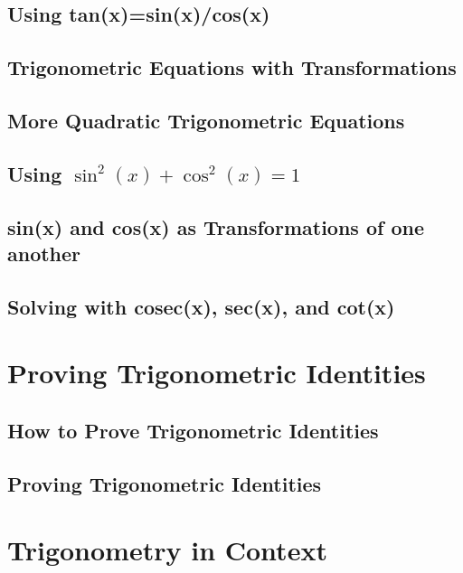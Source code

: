 \documentclass[../maths.tex]{subfiles}
\begin{document}
\subsection*{Using tan(x)=sin(x)/cos(x)}
\subsection*{Trigonometric Equations with Transformations}
\subsection*{More Quadratic Trigonometric Equations}
\subsection*{Using \texorpdfstring{$\sin^2(x)+\cos^2(x)=1$}{sin squared(x)+cos squared(x)=1}}
\subsection*{sin(x) and cos(x) as Transformations of one another}
\subsection*{Solving with cosec(x), sec(x), and cot(x)}
\section{Proving Trigonometric Identities}
\subsection*{How to Prove Trigonometric Identities}
\subsection*{Proving Trigonometric Identities}
\section{Trigonometry in Context}
\end{document}
